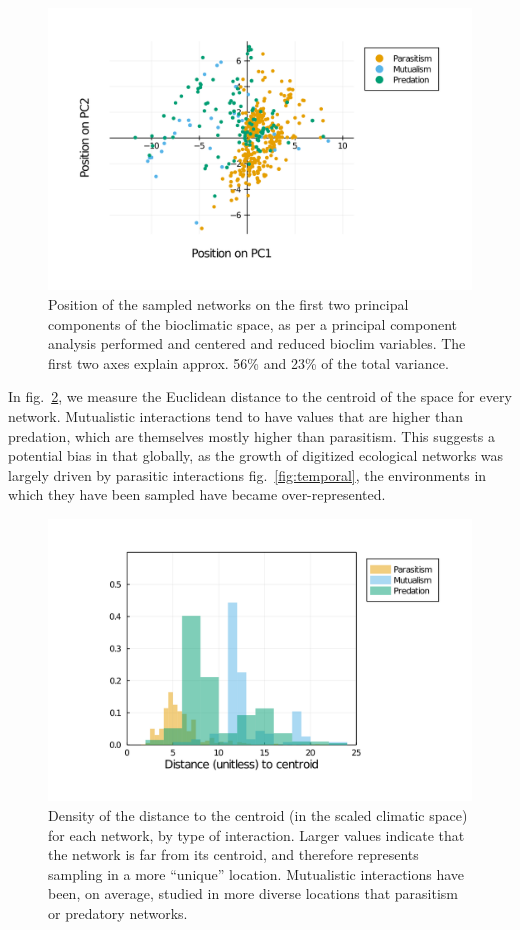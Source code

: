 \documentclass[11pt]{article}
\makeatletter
\def\maxwidth{\ifdim\Gin@nat@width>\linewidth\linewidth
\else\Gin@nat@width\fi}
\let\Oldincludegraphics\includegraphics
\renewcommand{\includegraphics}[1]{\Oldincludegraphics[width=\maxwidth]{#1}}
\makeatother
\begin{document}
\begin{figure}
\hypertarget{fig:pca}{%
\centering
\includegraphics{figures/networks_pca.png}
\caption{Position of the sampled networks on the first two principal
components of the bioclimatic space, as per a principal component
analysis performed and centered and reduced bioclim variables. The first
two axes explain approx. 56\% and 23\% of the total
variance.}\label{fig:pca}
}
\end{figure}

In fig.~\ref{fig:ecc}, we measure the Euclidean distance to the centroid
of the space for every network. Mutualistic interactions tend to have
values that are higher than predation, which are themselves mostly
higher than parasitism. This suggests a potential bias in that globally,
as the growth of digitized ecological networks was largely driven by
parasitic interactions fig.~\ref{fig:temporal}, the environments in
which they have been sampled have became over-represented.

\begin{figure}
\hypertarget{fig:ecc}{%
\centering
\includegraphics{figures/distance_to_centroid.png}
\caption{Density of the distance to the centroid (in the scaled climatic
space) for each network, by type of interaction. Larger values indicate
that the network is far from its centroid, and therefore represents
sampling in a more ``unique'' location. Mutualistic interactions have
been, on average, studied in more diverse locations that parasitism or
predatory networks.}\label{fig:ecc}
}
\end{figure}
\end{document}
